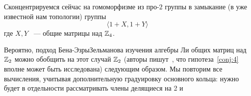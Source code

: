 Сконцентрируемся сейчас на гомоморфизме из про-$2$ группы в замыкание (в уже известной нам топологии) группы
\[\langle 1+X, 1+Y \rangle\]
где $X,Y$ ~--- общие матрицы над $\mathbb{Z}_4$.

Вероятно, подход Бена-Эзры\textemdash Зельманова изучения алгебры Ли общих матриц над $\mathbb{Z}_2$ можно обобщить на этот случай $\mathbb{Z}_2$ (авторы пишут~\cite[BEZ]{Ben-Ezra-Zelmanov}, что гипотеза~\ref{conj:4} вполне может быть исследована) следующим образом.
Мы повторим все вычисления, учитывая дополнительную градуировку основного кольца: нужно будет в отдельности рассматривать члены делящиеся на 2 и

